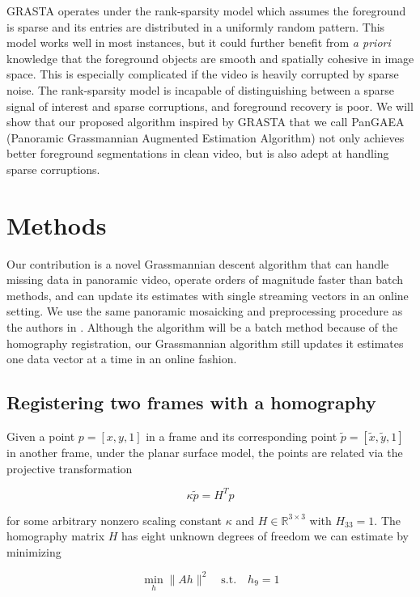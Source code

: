 \documentclass[10pt,twocolumn,letterpaper]{article}
\begin{document}
GRASTA operates under the rank-sparsity model which assumes the foreground is sparse and its entries are distributed in a uniformly random pattern. This model works well in most instances, but it could further benefit from \textit{a priori} knowledge that the foreground objects are smooth and spatially cohesive in image space. This is especially complicated if the video is heavily corrupted by sparse noise. The rank-sparsity model is incapable of distinguishing between a sparse signal of interest and sparse corruptions, and foreground recovery is poor. We will show that our proposed algorithm inspired by GRASTA that we call PanGAEA (Panoramic Grassmannian Augmented Estimation Algorithm) not only achieves better foreground segmentations in clean video, but is also adept at handling sparse corruptions.

\section{Methods} \label{section:methods}
Our contribution is a novel Grassmannian descent algorithm that can handle missing data in panoramic video, operate orders of magnitude faster than batch methods, and can update its estimates with single streaming vectors in an online setting. We use the same panoramic mosaicking and preprocessing procedure as the authors in \cite{B.Moore}. Although the algorithm will be a batch method because of the homography registration, our Grassmannian algorithm still updates it estimates one data vector at a time in an online fashion.

\subsection{Registering two frames with a homography \cite{B.Moore}}

Given a point $p = [x,y,1]$ in a frame and its corresponding point $\tilde{p} = [\tilde{x},\tilde{y},1]$ in another frame, under the planar surface model, the points are related via the projective transformation

\begin{equation*}
	\kappa \tilde{p} = H^Tp
\end{equation*}

\noindent for some arbitrary nonzero scaling constant $\kappa$ and $H \in \mathbb{R}^{3\times3}$ with $H_{33}=1$. The homography matrix $H$ has eight unknown degrees of freedom we can estimate by minimizing 

\begin{equation} 	 \label{eq:homography}
	\min_h \|Ah\|^2 \quad \text{s.t.} \quad h_9 = 1
\end{equation}
\end{document}

